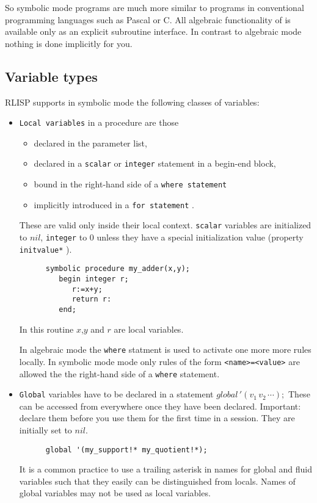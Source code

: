So symbolic mode programs are much more similar to
programs in conventional programming languages such as
Pascal or C. All algebraic functionality of {\reduce} is 
available only as an explicit subroutine interface.
In contrast to algebraic mode nothing is done implicitly
for you.

\subsection{Variable types}

RLISP supports in symbolic mode the following classes of variables:

\begin{itemize}
\item {\tt Local variables} in a procedure are
 those 
  \begin{itemize}
   \item declared in the parameter list, 
   \item declared in a {\tt scalar}
      or {\tt integer}
       statement in a begin-end block,
   \item bound in the right-hand side of a {\tt where statement}
   \item  implicitly introduced in a {\tt for statement}
      . 
  \end{itemize}
 These are
 valid only inside their local context. {\tt scalar} variables
 are initialized to $nil$, {\tt integer} to 0 unless they
 have a special initialization value (property {\tt initvalue*}
 ).
\begin{verbatim}
      symbolic procedure my_adder(x,y);
         begin integer r;
            r:=x+y;
            return r:
         end;
\end{verbatim}
In this routine $x$,$y$ and $r$ are local variables.

In algebraic mode the {\tt where} statment is used to activate
one more more rules locally. In symbolic mode mode only rules
of the form \verb+<name>=<value>+ are allowed the the right-hand
side of a {\tt where} statement.

\item {\tt Global} variables have to be declared
 in a statement $global\, '(v_1\,v_2\,\cdots);$ These
 can be accessed from everywhere once they have been
 declared. Important: declare them before you use
 them for the first time in a session. They are
 initially set to $nil$.
\begin{verbatim}
      global '(my_support!* my_quotient!*);
\end{verbatim}
 It is a common practice to use a trailing asterisk in names
 for global and fluid variables such that they easily
 can be distinguished from locals. Names of global variables
 may not be used as local variables. 


\end{itemize}
